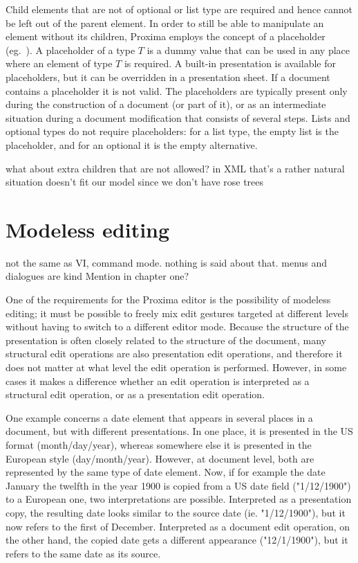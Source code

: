 Child elements that are not of optional or list type are required and hence cannot be left out of the parent element. In order to still be able to manipulate an element without its children, Proxima employs the concept of a placeholder (eg.~\cite{syngen}). A placeholder of a type $T$ is a dummy value that can be used in any place where an element of type $T$ is required. A built-in presentation is available for placeholders, but it can be overridden in a presentation sheet. If a document contains a placeholder it is not valid. The placeholders are typically present only during the construction of a document (or part of it), or as an intermediate situation during a document modification that consists of several steps. Lists and optional types do not require placeholders: for a list type, the empty list is the placeholder, and for an optional it is the empty alternative.

\bc
what about extra children that are not allowed? in XML that's a rather natural situation doesn't fit our model since we don't have rose trees
\ec

%																
%																
%																
\section{Modeless editing}

\bc
not the same as VI, command mode. nothing is said about that. menus and dialogues are kind %
Mention in chapter one?
\ec

One of the requirements for the Proxima editor is the possibility of modeless editing; it must be possible to freely mix edit gestures targeted at different levels without having to switch to a different editor mode. Because the structure of the presentation is often closely related to the structure of the document, many structural edit operations are also presentation edit operations, and therefore it does not matter at what level the edit operation is performed. However, in some cases it makes a difference whether an edit operation is interpreted as a structural edit operation, or as a presentation edit operation.


One example concerns a date element that appears in several places in a document, but with different presentations. In one place, it is presented in the US format (month/day/year), whereas somewhere else it is presented in the European style (day/month/year). However, at document level, both are represented by the same type of date element. Now, if for example the date January the twelfth in the year 1900 is copied from a US date field ("1/12/1900") to a European one, two interpretations are possible. Interpreted as a presentation copy, the resulting date looks similar to the source date (ie. "1/12/1900"), but it now refers to the first of December. Interpreted as a document edit operation, on the other hand, the copied date gets a different appearance ("12/1/1900"), but it refers to the same date as its source.

